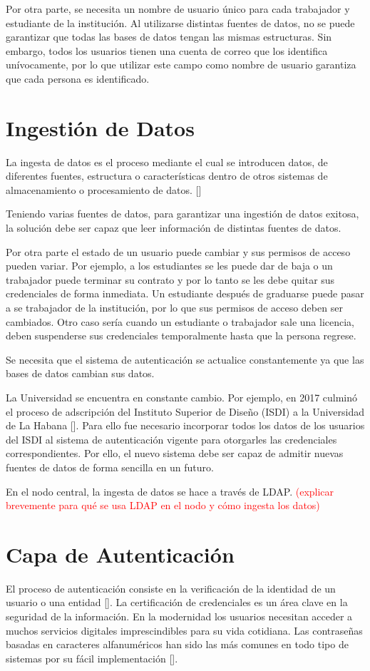 Por otra parte, se necesita un nombre de usuario único para cada trabajador y estudiante de la institución. Al utilizarse distintas fuentes de datos, no se puede garantizar que todas las bases de datos tengan las mismas estructuras. Sin embargo, todos los usuarios tienen una cuenta de correo que los identifica unívocamente, por lo que utilizar este campo como nombre de usuario garantiza que cada persona es identificado.

\section*{Ingestión de Datos}
La ingesta de datos es el proceso mediante el cual se introducen datos, de diferentes fuentes,
estructura o características dentro de otros sistemas de almacenamiento o procesamiento de
datos.  [\cite{fernandez2020aplicacion}]

Teniendo varias fuentes de datos, para garantizar una ingestión de datos exitosa, la solución debe ser capaz que leer información de distintas fuentes de datos. 

Por otra parte el estado de un usuario puede cambiar y sus permisos de acceso pueden variar. Por ejemplo, a los estudiantes se les puede dar de baja o un trabajador puede terminar su contrato y por lo tanto se les debe quitar sus credenciales de forma inmediata. Un estudiante después de graduarse puede pasar a se trabajador de la institución, por lo que sus permisos de acceso deben ser cambiados. Otro caso sería cuando un estudiante o trabajador sale una licencia, deben suspenderse sus credenciales temporalmente hasta que la persona regrese. 

Se necesita que el sistema de autenticación se actualice constantemente ya que las bases de datos cambian sus datos.

La Universidad  se encuentra en constante cambio. Por ejemplo, en 2017 culminó el proceso de adscripción del Instituto Superior de Diseño (ISDI) a la Universidad de La Habana [\cite{isdi-historia}]. Para ello fue necesario incorporar todos los datos de los usuarios del ISDI al sistema de autenticación vigente para otorgarles las credenciales correspondientes. Por ello, el nuevo sistema debe ser capaz de admitir nuevas fuentes de datos de forma sencilla en un futuro. 

En el nodo central, la ingesta de datos se hace a través de LDAP. \textcolor{red}{(explicar brevemente para qué se usa LDAP en el nodo y cómo ingesta los datos)}

\section*{Capa de Autenticación}
El proceso de autenticación consiste en la verificación de la identidad de un usuario o una entidad  [\cite{teheran2014mecanismo}]. La certificación de credenciales es un área clave en la seguridad de la información. En la modernidad los usuarios necesitan acceder a muchos servicios digitales imprescindibles para su vida cotidiana. Las contraseñas basadas en caracteres alfanuméricos han sido las más comunes en todo tipo de sistemas por su fácil implementación [\cite{rodriguez2018seguridad}].

